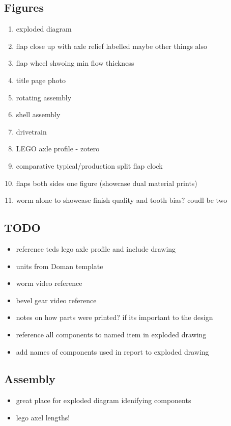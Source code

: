 \documentclass[11pt]{article}
\begin{document}
\subsection{Figures}
\label{sec:org4f83416}
\begin{enumerate}
\item exploded diagram
\item flap close up with axle relief labelled maybe other things also
\item flap wheel shwoing min flow thickness
\item title page photo
\item rotating assembly
\item shell assembly
\item drivetrain
\item LEGO axle profile - zotero
\item comparative typical/production split flap clock
\item flaps both sides one figure (showcase dual material prints)
\item worm alone to showcase finish quality and tooth bias? coudl be two
\end{enumerate}

\subsection{{\bfseries\sffamily TODO} }
\label{sec:org3704c6a}
\begin{itemize}
\item reference teds lego axle profile and include drawing
\item units from Doman template
\item worm video reference
\item bevel gear video reference
\item notes on how parts were printed? if its important to the design
\item reference all components to named item in exploded drawing
\item add names of components used in report to exploded drawing
\end{itemize}

\subsection{Assembly}
\label{sec:orgf43d9c0}
\begin{itemize}
\item great place for exploded diagram idenifying components
\item lego axel lengths!
\end{itemize}
\end{document}
